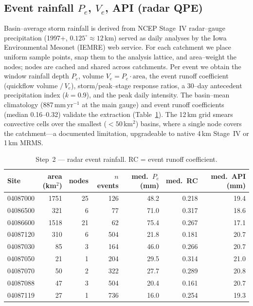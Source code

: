 \documentclass[11pt]{article}
\begin{document}
\subsection{Event rainfall $P_e$, $V_e$, API (radar QPE)}
Basin--average storm rainfall is derived from NCEP Stage~IV radar--gauge precipitation
(1997+, $0.125^{\circ}\approx12$\,km) served as daily analyses by the Iowa Environmental
Mesonet (IEMRE) web service. For each catchment we place uniform sample points, snap them to
the analysis lattice, and area--weight the nodes; nodes are cached and shared across
catchments. Per event we obtain the window rainfall depth $P_e$, volume $V_e=P_e\cdot\text{area}$,
the event runoff coefficient (quickflow volume $/\,V_e$), storm/peak--stage response ratios,
a 30--day antecedent precipitation index ($k=0.9$), and the peak daily intensity. The
basin--mean climatology (887\,mm\,yr$^{-1}$ at the main gauge) and event runoff coefficients
(median 0.16--0.32) validate the extraction (Table~\ref{tab:rain}). The 12\,km grid smears
convective cells over the smallest ($<50$\,km$^2$) basins, where a single node covers the
catchment---a documented limitation, upgradeable to native 4\,km Stage~IV or 1\,km MRMS.

\begin{table}[htbp]\centering
\caption{Step~2 --- radar event rainfall. RC = event runoff coefficient.}
\label{tab:rain}
\small
\begin{tabular}{lrrrrrr}
\toprule
Site & area (km$^2$) & nodes & $n$ events & med.\ $P_e$ (mm) & med.\ RC & med.\ API (mm) \\
\midrule
04087000 & 1751 & 25 & 126 & 48.2 & 0.218 & 19.4 \\
04086500 & 321  & 6  & 77  & 71.0 & 0.317 & 18.6 \\
04086600 & 1518 & 21 & 62  & 75.4 & 0.267 & 17.1 \\
04087120 & 310  & 6  & 504 & 21.8 & 0.181 & 20.7 \\
04087030 & 85   & 3  & 164 & 46.0 & 0.266 & 20.7 \\
04087050 & 21   & 1  & 204 & 29.5 & 0.314 & 21.0 \\
04087070 & 50   & 2  & 322 & 27.7 & 0.289 & 20.8 \\
04087088 & 47   & 3  & 504 & 20.4 & 0.161 & 20.7 \\
04087119 & 27   & 1  & 736 & 16.0 & 0.254 & 19.3 \\
\bottomrule
\end{tabular}
\end{table}
\end{document}
